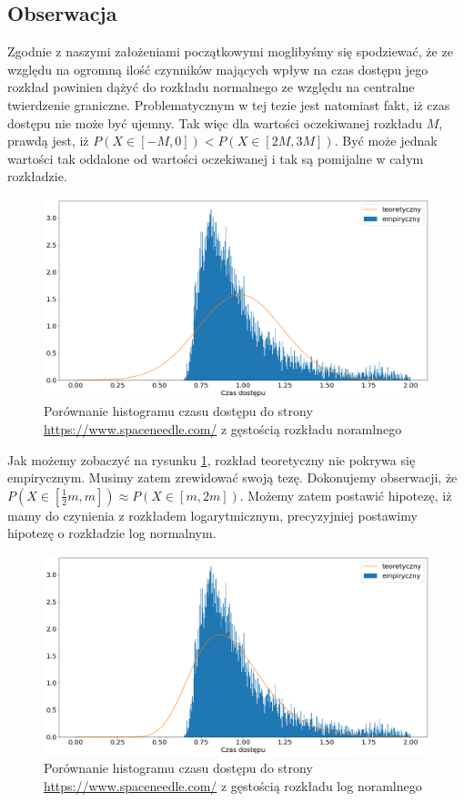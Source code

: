 \subsection{Obserwacja}
Zgodnie z naszymi założeniami początkowymi moglibyśmy się spodziewać, że ze względu na ogromną ilość czynników mających wpływ na czas dostępu jego rozkład powinien dążyć do rozkładu normalnego ze względu na centralne twierdzenie graniczne. Problematycznym w tej tezie jest natomiast fakt, iż czas dostępu nie może być ujemny. Tak więc dla wartości oczekiwanej rozkładu $M$, prawdą jest, iż $P(X \in [-M, 0]) < P(X \in [2M, 3M])$. Być może jednak wartości tak oddalone od wartości oczekiwanej i tak są pomijalne w całym rozkładzie. 
\begin{figure}[!htp]
    \centering
    \includegraphics[width=15cm]{norm-ping-dist}
    \caption{Porównanie histogramu czasu dostępu do strony \url{https://www.spaceneedle.com/} z gęstością rozkładu noramlnego}
    \label{fig:bad_dist}
\end{figure}
Jak możemy zobaczyć na rysunku \ref{fig:bad_dist}, rozkład teoretyczny nie pokrywa się empirycznym. Musimy zatem zrewidować swoją tezę. Dokonujemy obserwacji, że $P(X \in [\frac{1}{2}m, m]) \approx P(X \in [m, 2m])$. Możemy zatem postawić hipotezę, iż mamy do czynienia z rozkładem logarytmicznym, precyzyjniej postawimy hipotezę o rozkładzie log normalnym.
\begin{figure}[!htp]
    \centering
    \includegraphics[width=15cm]{lognorm-ping-dist}
    \caption{Porównanie histogramu czasu dostępu do strony \url{https://www.spaceneedle.com/} z gęstością rozkładu log noramlnego}
    \label{fig:better_dist}
\end{figure}
